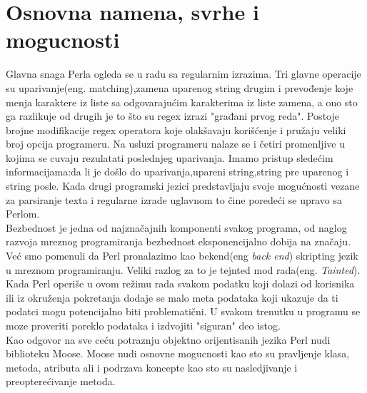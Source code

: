 \documentclass[12pt]{article}
\begin{document}
\section{Osnovna namena, svrhe i mogucnosti}

Glavna snaga Perla ogleda se u radu sa regularnim izrazima. Tri glavne operacije su uparivanje(eng. matching),zamena uparenog string drugim i prevođenje koje menja karaktere iz liste sa odgovarajućim karakterima iz liste zamena\cite{id}, a ono sto ga razlikuje od drugih je to što su regex izrazi "građani prvog reda"\cite{prviRed}. Postoje brojne modifikacije regex operatora koje olakšavaju korišćenje i pružaju veliki broj opcija programeru. Na usluzi programeru nalaze se i četiri promenljive u kojima se cuvaju rezulatati poslednjeg uparivanja. Imamo pristup sledećim informacijama:da li je došlo do uparivanja,upareni string,string pre uparenog i string posle\cite{friedl2006mastering}. Kada drugi programski jezici predstavljaju svoje mogućnosti vezane za parsiranje texta i regularne izrade uglavnom to čine poredeći se upravo sa Perlom.\\
Bezbednost je jedna od najznačajnih komponenti svakog programa, od naglog razvoja mreznog programiranja bezbednost eksponencijalno dobija na značaju. Već smo pomenuli da Perl pronalazimo kao bekend(eng {\em back end}) skripting jezik u mreznom programiranju. Veliki razlog za to je tejnted mod rada(eng. {\em Tainted}). Kada Perl operiše u ovom režimu rada svakom podatku koji dolazi od korisnika ili iz okruženja pokretanja dodaje se malo meta podataka koji ukazuje da ti podatci mogu potencijalno biti problematični. U svakom trenutku u programu se moze proveriti poreklo podataka i izdvojiti "siguran" deo istog\cite{modern}.\\
Kao odgovor na sve ceću potraznju objektno orijentisanih jezika Perl nudi biblioteku Moose. Moose nudi osnovne mogucnosti kao sto su pravljenje klasa, metoda, atributa ali i podrzava koncepte kao sto su nasledjivanje i preopterećivanje metoda. 

\pagebreak








\end{document}
